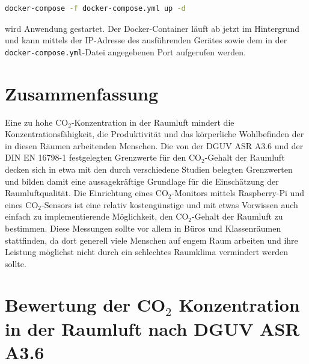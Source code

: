\documentclass[a4paper,
    12pt,
    headings=small,
    ngerman,
    listof=totoc,
    numbers=noenddot]{scrreprt}[2021/11/13]
\begin{document}
\begin{lstlisting}[language=Bash]
  docker-compose -f docker-compose.yml up -d
\end{lstlisting}

wird Anwendung gestartet. Der \gls{Docker}-Container läuft ab jetzt im Hintergrund und kann mittels der IP-Adresse des ausführenden Gerätes sowie dem in der \texttt{docker-compose.yml}-Datei angegebenen Port aufgerufen werden.



\chapter{Zusammenfassung}
Eine zu hohe CO$_2$-Konzentration in der Raumluft mindert die Konzentrationsfähigkeit, die Produktivität und das körperliche Wohlbefinden der in diesen Räumen arbeitenden Menschen. Die von der \ac{DGUV} \ac{ASR} A3.6 \autocite{ASR} und der DIN EN 16798-1 \autocite{din_en_16798} festgelegten Grenzwerte für den CO$_2$-Gehalt der Raumluft decken sich in etwa mit den durch verschiedene Studien belegten Grenzwerten und bilden damit eine aussagekräftige Grundlage für die Einschätzung der Raumluftqualität. Die Einrichtung eines CO$_2$-Monitors mittels Raspberry-Pi und eines CO$_2$-Sensors ist eine relativ kostengünstige und mit etwas Vorwissen auch einfach zu implementierende Möglichkeit, den CO$_2$-Gehalt der Raumluft zu bestimmen. Diese Messungen sollte vor allem in Büros und Klassenräumen stattfinden, da dort generell viele Menschen auf engem Raum arbeiten und ihre Leistung möglichst nicht durch ein schlechtes Raumklima vermindert werden sollte.



\newpage

\listoffigures
\lstlistoflistings
\printglossary
\printbibliography

\newpage

\appendix
{}

\tableofcontents
\listoftables



\chapter{Bewertung der CO\texorpdfstring{$_2$}{TEXT} Konzentration in der Raumluft nach \ac{DGUV} \ac{ASR} A3.6}
\end{document}
